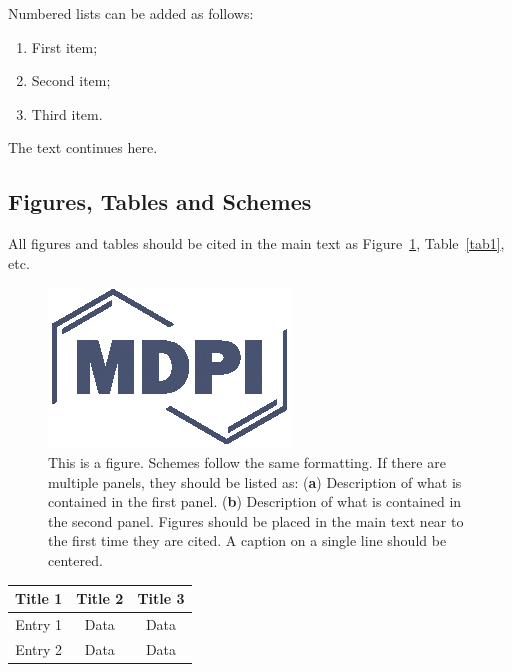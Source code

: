 Numbered lists can be added as follows:
\begin{enumerate}
\item	First item; 
\item	Second item;
\item	Third item.
\end{enumerate}

The text continues here. 

\subsection{Figures, Tables and Schemes}

All figures and tables should be cited in the main text as Figure~\ref{fig1}, Table~\ref{tab1}, etc.

\begin{figure}[H]
\includegraphics[width=10.5 cm]{Definitions/logo-mdpi}
\caption{This is a figure. Schemes follow the same formatting. If there are multiple panels, they should be listed as: (\textbf{a}) Description of what is contained in the first panel. (\textbf{b}) Description of what is contained in the second panel. Figures should be placed in the main text near to the first time they are cited. A caption on a single line should be centered.\label{fig1}}
\end{figure}   

\begin{specialtable}[H] 
\caption{This is a table caption. Tables should be placed in the main text near to the first time they are~cited.\label{tab1}}
\begin{tabular}{ccc}
\toprule
\textbf{Title 1}	& \textbf{Title 2}	& \textbf{Title 3}\\
\midrule
Entry 1		& Data			& Data\\
Entry 2		& Data			& Data\\
\bottomrule
\end{tabular}
\end{specialtable}

